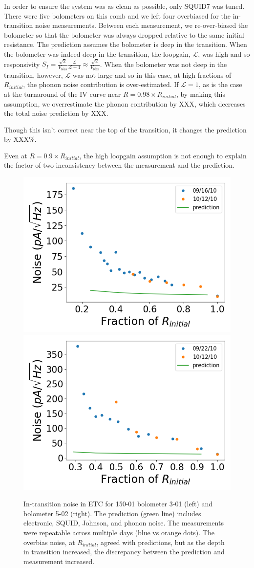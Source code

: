 In order to ensure the system was as clean as possible, only \ac{SQUID}7 was tuned. 
There were five bolometers on this comb and we left four overbiased for the in-transition noise measurements. 
Between each measurement, we re-over-biased the bolometer so that the bolometer was always dropped relative to the same initial resistance. 
The prediction assumes the bolometer is deep in the transition. 
When the bolometer was indeed deep in the transition, the loopgain, $\mathscr{L}$, was high and so responsivity $S_{I} = \frac{\sqrt{2}}{V_{bias}} \frac{\mathscr{L}}{\mathscr{L}+1} \approx \frac{\sqrt{2}}{V_{bias}} $. 
When the bolometer was not deep in the transition, however, $\mathscr{L}$ was not large and so in this case, at high fractions of $R_{initial}$, the phonon noise contribution is over-estimated. 
If $\mathscr{L} = 1$, as is the case at the turnaround of the IV curve near $R = 0.98 \times R_{initial}$, by making this assumption, we overrestimate the phonon contribution by XXX, which decreases the total noise prediction by XXX. 

Though this isn't correct near the top of the transition, it changes the prediction by XXX\%. 

Even at $R = 0.9 \times R_{initial}$, the high loopgain assumption is not enough to explain the factor of two inconsistency between the measurement and the prediction. 
 

\begin{figure}[ht!]
\begin{center}
\includegraphics[width=0.48\columnwidth]{figures/b54w2c0_it_noise.png}
\includegraphics[width=0.48\columnwidth]{figures/b54w2c3_it_noise.png}
\caption{In-transition noise in \ac{ETC} for 150-01 bolometer 3-01 (left) and bolometer 5-02 (right). The prediction (green line) includes electronic, \ac{SQUID}, Johnson, and phonon noise. The measurements were repeatable across multiple days (blue vs orange dots). The overbias noise, at $R_{initial}$, agreed with predictions, but as the depth in transition increased, the discrepancy between the prediction and measurement increased. 
\label{fig:etc_it_noise} }
\end{center}
\end{figure}

